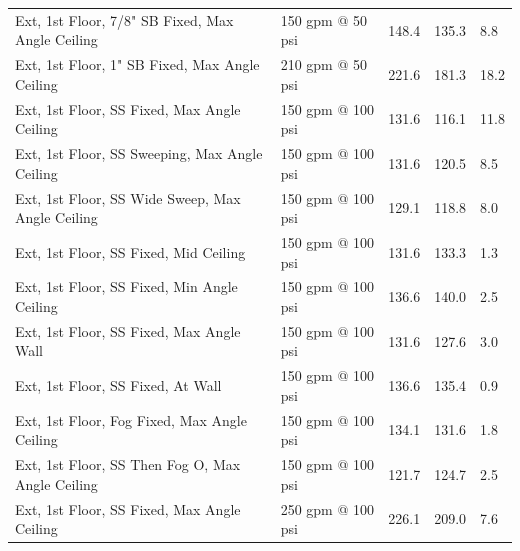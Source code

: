 \documentclass[12pt,oneside]{book}
\begin{document}
\begin{table}[!ht]
\begin{tabular}{lllll}
Ext, 1st Floor, 7/8" SB Fixed, Max Angle Ceiling      & 150 gpm @ 50 psi               & 148.4                             & 135.3                              & 8.8                    \\
Ext, 1st Floor, 1" SB Fixed, Max Angle Ceiling        & 210 gpm @ 50 psi               & 221.6                             & 181.3                              & 18.2                   \\
Ext, 1st Floor, SS Fixed, Max Angle Ceiling           & 150 gpm @ 100 psi              & 131.6                             & 116.1                              & 11.8                   \\
Ext, 1st Floor, SS Sweeping, Max Angle Ceiling        & 150 gpm @ 100 psi              & 131.6                             & 120.5                              & 8.5                    \\
Ext, 1st Floor, SS Wide Sweep, Max Angle Ceiling      & 150 gpm @ 100 psi              & 129.1                             & 118.8                              & 8.0                    \\
Ext, 1st Floor, SS Fixed, Mid Ceiling                 & 150 gpm @ 100 psi              & 131.6                             & 133.3                              & 1.3                    \\
Ext, 1st Floor, SS Fixed, Min Angle Ceiling           & 150 gpm @ 100 psi              & 136.6                             & 140.0                              & 2.5                    \\
Ext, 1st Floor, SS Fixed, Max Angle Wall              & 150 gpm @ 100 psi              & 131.6                             & 127.6                              & 3.0                    \\
Ext, 1st Floor, SS Fixed, At Wall                     & 150 gpm @ 100 psi              & 136.6                             & 135.4                              & 0.9                    \\
Ext, 1st Floor, Fog Fixed, Max Angle Ceiling          & 150 gpm @ 100 psi              & 134.1                             & 131.6                              & 1.8                    \\
Ext, 1st Floor, SS Then Fog O, Max Angle Ceiling      & 150 gpm @ 100 psi              & 121.7                             & 124.7                              & 2.5                    \\
Ext, 1st Floor, SS Fixed, Max Angle Ceiling           & 250 gpm @ 100 psi              & 226.1                             & 209.0                              & 7.6                    \\

\end{tabular}
\end{table}
\end{document}
